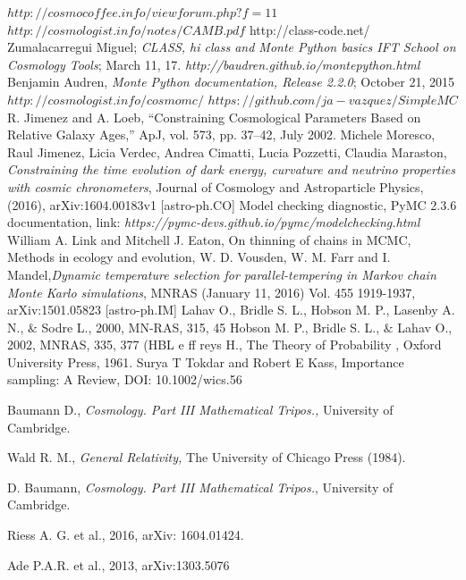 \documentclass[onecolumn,           %
               showpacs,            %
               preprintnumbers,     %
               aps,                 %
               prl,          	    %
               letterpaper,             %
               superscriptaddress,      %
               nofootinbib,         %
               tightenlines,        %
               floats,floatfix      %
               ,usenatbib,
               ]{revtex4-1}
\begin{document}
\begin{thebibliography}{9}
$http://cosmocoffee.info/viewforum.php?f=11$
 $http://cosmologist.info/notes/CAMB.pdf$
 http://class-code.net/
Zumalacarregui Miguel; \textit{CLASS, hi class and Monte Python basics IFT School on Cosmology Tools}; March 11, 17.
\textit{http://baudren.github.io/montepython.html}
Benjamin Audren, \textit{Monte Python documentation, Release 2.2.0}; October 21, 2015
$http://cosmologist.info/cosmomc/$	
$https://github.com/ja-vazquez/SimpleMC$
%
%
%
%
%
%
R. Jimenez and A. Loeb, “Constraining Cosmological Parameters Based on Relative Galaxy Ages,”
ApJ, vol. 573, pp. 37–42, July 2002.
Michele Moresco, Raul Jimenez, Licia Verdec, Andrea Cimatti, Lucia Pozzetti, Claudia Maraston, \textit{Constraining the time evolution of dark energy, curvature and neutrino properties with cosmic chronometers}, Journal of Cosmology and Astroparticle Physics, (2016), arXiv:1604.00183v1 [astro-ph.CO]
 Model checking diagnostic, PyMC 2.3.6 documentation, link: \textit{https://pymc-devs.github.io/pymc/modelchecking.html}
William A. Link and Mitchell J. Eaton, On thinning of chains in MCMC, Methods in ecology and evolution,
W. D. Vousden, W. M. Farr and I. Mandel,\textit{Dynamic temperature selection for parallel-tempering in Markov chain Monte Karlo simulations}, MNRAS (January 11, 2016) Vol. 455 1919-1937, arXiv:1501.05823 [astro-ph.IM]
Lahav O., Bridle S. L., Hobson M. P., Lasenby A. N., $\&$ Sodre L., 2000, MN-RAS, 315, 45
Hobson M. P., Bridle S. L., $\&$ Lahav O., 2002, MNRAS, 335, 377 (HBL
e
ff
reys H.,
The Theory of Probability
, Oxford University Press, 1961.
Surya T Tokdar and Robert E Kass, Importance sampling: A Review, DOI: 10.1002/wics.56

 Baumann D., \textit{Cosmology. Part III Mathematical Tripos.,} University of Cambridge.

 Wald R. M., \textit{General Relativity,} The University of Chicago Press (1984).

 D. Baumann, {\em Cosmology. Part III Mathematical Tripos.}, University of Cambridge.

 Riess A. G. et al., 2016, arXiv: 1604.01424.

 Ade P.A.R. et al., 2013, arXiv:1303.5076


\end{thebibliography}
\end{document}
